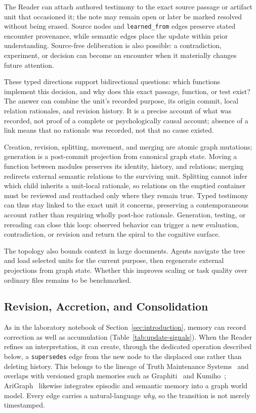 The Reader can attach authored testimony to the exact source passage or artifact unit that occasioned it; the note may remain open or later be marked resolved without being erased. Source nodes and \texttt{learned\_from} edges preserve stated encounter provenance, while semantic edges place the update within prior understanding. Source-free deliberation is also possible: a contradiction, experiment, or decision can become an encounter when it materially changes future attention.

These typed directions support bidirectional questions: which functions implement this decision, and why does this exact passage, function, or test exist? The answer can combine the unit's recorded purpose, its origin commit, local relation rationales, and revision history. It is a precise account of what was recorded, not proof of a complete or psychologically causal account; absence of a link means that no rationale was recorded, not that no cause existed.

Creation, revision, splitting, movement, and merging are atomic graph mutations; generation is a post-commit projection from canonical graph state. Moving a function between modules preserves its identity, history, and relations; merging redirects external semantic relations to the surviving unit. Splitting cannot infer which child inherits a unit-local rationale, so relations on the emptied container must be reviewed and reattached only where they remain true. Typed testimony can thus stay linked to the exact unit it concerns, preserving a contemporaneous account rather than requiring wholly post-hoc rationale. Generation, testing, or rereading can close this loop: observed behavior can trigger a new evaluation, contradiction, or revision and return the spiral to the cognitive surface.

The topology also bounds context in large documents. Agents navigate the tree and load selected units for the current purpose, then regenerate external projections from graph state. Whether this improves scaling or task quality over ordinary files remains to be benchmarked.

\subsection{Revision, Accretion, and Consolidation}
\label{sec:revision}

As in the laboratory notebook of Section~\ref{sec:introduction}, memory can record correction as well as accumulation (Table~\ref{tab:update-signals}). When the Reader refines an interpretation, it can create, through the dedicated operation described below, a \texttt{supersedes} edge from the new node to the displaced one rather than deleting history. This belongs to the lineage of Truth Maintenance Systems~\cite{doyle1979tms} and overlaps with versioned graph memories such as Graphiti~\cite{rasmussen2025graphiti} and Kumiho~\cite{park2026kumiho}; AriGraph~\cite{anokhin2025arigraph} likewise integrates episodic and semantic memory into a graph world model. Every edge carries a natural-language \textit{why}, so the transition is not merely timestamped.

